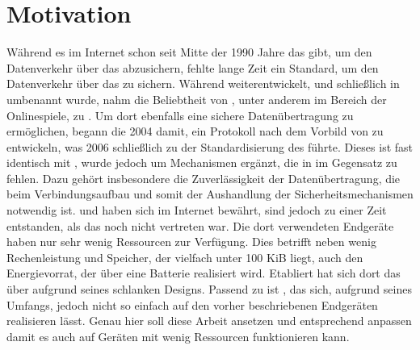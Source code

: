 \section{Motivation}
Während es im Internet schon seit Mitte der 1990 Jahre das  gibt, um den Datenverkehr
über das  abzusichern, fehlte lange Zeit ein Standard, um den Datenverkehr über das  zu sichern.
Während  weiterentwickelt, und schließlich in  \cite{rfc5246} umbenannt wurde, nahm die
Beliebtheit von , unter anderem im Bereich der Onlinespiele, zu \cite[Kapitel 1]{rfc6347}. Um dort ebenfalls
eine sichere Datenübertragung zu ermöglichen, begann die  2004 damit, ein Protokoll nach dem Vorbild von  zu entwickeln,
was 2006 schließlich zu der Standardisierung des  \cite{rfc6347} führte. Dieses ist fast identisch mit , wurde jedoch um
Mechanismen ergänzt, die in  im Gegensatz zu  fehlen. Dazu gehört insbesondere die Zuverlässigkeit der Datenübertragung,
die beim Verbindungsaufbau und somit der Aushandlung der Sicherheitsmechanismen notwendig ist.  und  haben sich im Internet
bewährt, sind jedoch zu einer Zeit entstanden, als das  noch nicht vertreten war. Die dort verwendeten Endgeräte haben nur sehr wenig
Ressourcen zur Verfügung. Dies betrifft neben wenig Rechenleistung und Speicher, der vielfach unter 100 KiB liegt, auch den Energievorrat, der
über eine Batterie realisiert wird. Etabliert hat sich dort das  \cite{draftcoap13} über  aufgrund seines schlanken Designs.
Passend zu  ist , das sich, aufgrund seines Umfangs, jedoch nicht so einfach auf den vorher beschriebenen Endgeräten realisieren
lässt. Genau hier soll diese Arbeit ansetzen und  entsprechend anpassen damit es auch auf Geräten mit wenig Ressourcen funktionieren kann.